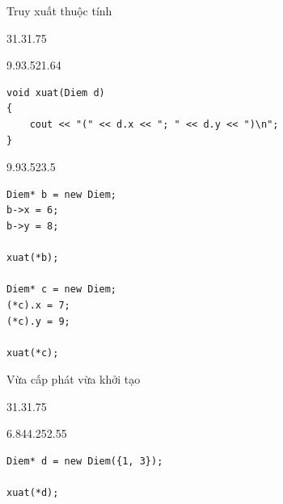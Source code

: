 \begin{frame}[fragile]{Truy xuất thuộc tính}
\begin{blk}{3}{1.3}{1.75}\end{blk}
\begin{blk}{9.9}{3.52}{1.64}
\begin{lstlisting}[basicstyle=\cf{10.6}]
void xuat(Diem d)
{
    cout << "(" << d.x << "; " << d.y << ")\n";
}
\end{lstlisting}
\end{blk}
\begin{blk}{9.9}{3.52}{3.5}
\begin{lstlisting}[basicstyle=\cf{10.3}]
Diem* b = new Diem;
b->x = 6;
b->y = 8;

xuat(*b);

Diem* c = new Diem;
(*c).x = 7;
(*c).y = 9;

xuat(*c);
\end{lstlisting}
\end{blk}
\end{frame}

\begin{frame}[fragile]{Vừa cấp phát vừa khởi tạo}
\begin{blk}{3}{1.3}{1.75}\end{blk}
\begin{blk}{6.84}{4.25}{2.55}
\begin{lstlisting}[basicstyle=\cf{11}]
Diem* d = new Diem({1, 3});

xuat(*d);
\end{lstlisting}
\end{blk}
\end{frame}

